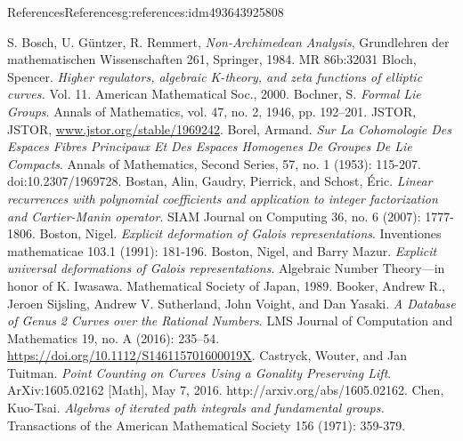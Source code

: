 \documentclass[oneside,10pt,]{book}
\numberwithin{equation}{section}
\begin{document}
\begin{references-chapter-numberless}{References}{}{References}{}{}{g:references:idm493643925808}
\begin{thebibliography}{9}
\hypertarget{x:biblio:bib-bgr}{}S. Bosch, U. Güntzer, R. Remmert, \textit{Non-Archimedean Analysis}, Grundlehren der mathematischen Wissenschaften 261, Springer, 1984. MR 86b:32031
\hypertarget{x:biblio:bib-bloch}{}Bloch, Spencer.  \textit{Higher regulators, algebraic K-theory, and zeta functions of elliptic curves.} Vol. 11. American Mathematical Soc., 2000.
\hypertarget{x:biblio:bib-bochner-formal}{}Bochner, S. \textit{Formal Lie Groups}. Annals of Mathematics, vol. 47, no. 2, 1946, pp. 192–201. JSTOR, JSTOR, \url{www.jstor.org/stable/1969242}.
\hypertarget{x:biblio:bib-borel-hopf}{}Borel, Armand. \textit{Sur La Cohomologie Des Espaces Fibres Principaux Et Des Espaces Homogenes De Groupes De Lie Compacts}. Annals of Mathematics, Second Series, 57, no. 1 (1953): 115-207. doi:10.2307\slash{}1969728.
\hypertarget{x:biblio:bib-bostan-gaudry-schost}{}Bostan, Alin, Gaudry, Pierrick, and Schost, Éric. \textit{Linear recurrences with polynomial coefficients and application to integer factorization and Cartier-Manin operator}. SIAM Journal on Computing 36, no. 6 (2007): 1777-1806.
\hypertarget{x:biblio:bib-boston-explicit}{}Boston, Nigel. \textit{Explicit deformation of Galois representations}. Inventiones mathematicae 103.1 (1991): 181-196.
\hypertarget{x:biblio:bib-boston-mazur}{}Boston, Nigel, and Barry Mazur. \textit{Explicit universal deformations of Galois representations}. Algebraic Number Theory—in honor of K. Iwasawa. Mathematical Society of Japan, 1989.
\hypertarget{x:biblio:bib-booker-database-genus-2}{}Booker, Andrew R., Jeroen Sijsling, Andrew V. Sutherland, John Voight, and Dan Yasaki. \textit{A Database of Genus 2 Curves over the Rational Numbers}. LMS Journal of Computation and Mathematics 19, no. A (2016): 235–54. \url{https://doi.org/10.1112/S146115701600019X}.
\hypertarget{x:biblio:bib-castryck-tuitman}{}Castryck, Wouter, and Jan Tuitman. \textit{Point Counting on Curves Using a Gonality Preserving Lift}. ArXiv:1605.02162 [Math], May 7, 2016. http:\slash{}\slash{}arxiv.org\slash{}abs\slash{}1605.02162.
\hypertarget{x:biblio:bib-chen}{}Chen, Kuo-Tsai.  \textit{Algebras of iterated path integrals and fundamental groups.} Transactions of the American Mathematical Society 156 (1971): 359-379.

\end{thebibliography}
\end{references-chapter-numberless}
\end{document}
